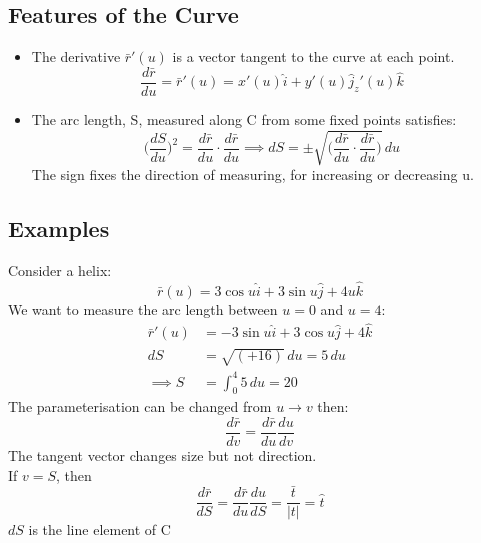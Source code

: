 \documentclass[a4paper, 11pt, normalem]{report}
\begin{document}
\subsection{Features of the Curve}
\begin{itemize}
    \item The derivative $\bar{r}'(u)$ is a vector tangent to the curve at each point.
            \begin{equation*}
                \frac{d\bar{r}}{du} = \bar{r}'(u) = x'(u)\hat{i} + y'(u)\hat{j} _ z'(u)\hat{k}
            \end{equation*}
    \item The arc length, S, measured along C from some fixed points satisfies:
            \begin{equation*}
                \Big(\frac{dS}{du}\Big)^2 = \frac{d\bar{r}}{du} \cdot \frac{d\bar{r}}{du} \implies dS = \pm \sqrt{\Big(\frac{d\bar{r}}{du} \cdot \frac{d\bar{r}}{du} \Big)} \,du
            \end{equation*}
            The sign fixes the direction of measuring, for increasing or decreasing u.
\end{itemize}

\subsection{Examples}
Consider a helix:
\begin{equation*}
    \bar{r}(u) = 3\cos u\hat{i} + 3\sin u\hat{j} + 4u\hat{k}
\end{equation*}
We want to measure the arc length between $u = 0$ and $u = 4$:
\begin{align*}
    \bar{r}'(u) &= -3\sin u\hat{i} + 3\cos u\hat{j} + 4\hat{k} \\
    dS &= \sqrt{( + 16)}\,du = 5\,du \\
    \implies S &= \int_{0}^{4} 5\,du = 20
\end{align*}
The parameterisation can be changed from $u \to v$ then:
\begin{equation*}
    \frac{d\bar{r}}{dv} = \frac{d\bar{r}}{du}\frac{du}{dv}
\end{equation*}
The tangent vector changes size but not direction. \\
If $v = S$, then
\begin{equation*}
    \frac{d\bar{r}}{dS} = \frac{d\bar{r}}{du}\frac{du}{dS} = \frac{\bar{t}}{|t|} = \hat{t}
\end{equation*}
$dS$ is the line element of C
\end{document}

